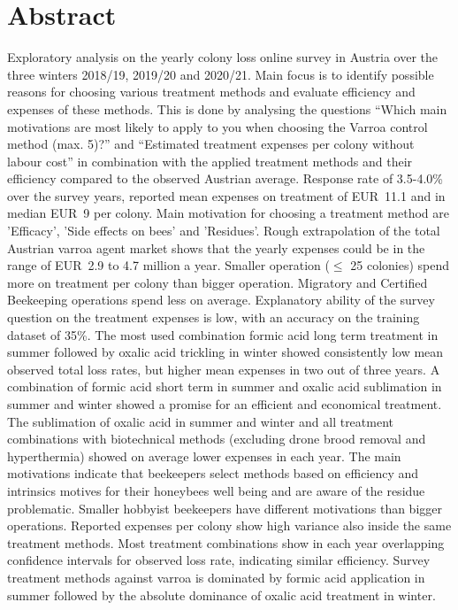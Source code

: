 \chapter*{Abstract}
\label{sec:abstract}
\vspace*{-10mm}

Exploratory analysis on the yearly colony loss online survey in Austria over the three winters 2018/19, 2019/20 and 2020/21. Main focus is to identify possible reasons for choosing various treatment methods and evaluate efficiency and expenses of these methods. This is done by analysing the questions \enquote{Which main motivations are most likely to apply to you when choosing the Varroa control method (max. 5)?} and \enquote{Estimated treatment expenses per colony without labour cost} in combination with the applied treatment methods and their efficiency compared to the observed Austrian average. Response rate of 3.5-4.0\% over the survey years, reported mean expenses on treatment of EUR~11.1 and in median EUR~9 per colony. Main motivation for choosing a treatment method are 'Efficacy', 'Side effects on bees' and 'Residues'. Rough extrapolation of the total Austrian varroa agent market shows that the yearly expenses could be in the range of EUR~2.9 to 4.7 million a year. Smaller operation ($\leq$ 25 colonies) spend more on treatment per colony than bigger operation. Migratory and Certified Beekeeping operations spend less on average. Explanatory ability of the survey question on the treatment expenses is low, with an accuracy on the training dataset of 35\%. The most used combination formic acid long term treatment in summer followed by oxalic acid trickling in winter showed consistently low mean observed total loss rates, but higher mean expenses in two out of three years. A combination of formic acid short term in summer and oxalic acid sublimation in summer and winter showed a promise for an efficient and economical treatment. The sublimation of oxalic acid in summer and winter and all treatment combinations with biotechnical methods (excluding drone brood removal and hyperthermia) showed on average lower expenses in each year. The main motivations indicate that beekeepers select methods based on efficiency and intrinsics motives for their honeybees well being and are aware of the residue problematic. Smaller hobbyist beekeepers have different motivations than bigger operations. Reported expenses per colony show high variance also inside the same treatment methods. Most treatment combinations show in each year overlapping confidence intervals for observed loss rate, indicating similar efficiency. Survey treatment methods against varroa is dominated by formic acid application in summer followed by the absolute dominance of oxalic acid treatment in winter.
